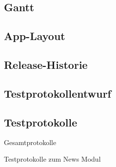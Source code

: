 \newpage



\subsection{Gantt}
\begin{landscape}
	
\end{landscape}

\subsection{App-Layout}
\label{subsec:App-Layout}
	
	
\subsection{Release-Historie}
\label{subsec:Release-Historie}
		
	
\subsection{Testprotokollentwurf}
\label{subsec:Testprotokollentwurf}
	
	
	


	
\subsection{Testprotokolle}
\label{subsec:Testprotokolle}

\Large{Gesamtprotokolle}


	

	
	
\Large{Testprotokolle zum News Modul}



